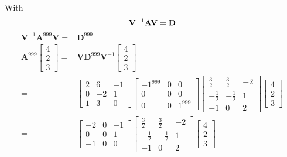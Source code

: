 \documentclass[12pt]{article}
\newcommand{\matr}[1]{\mathbf{#1}}
\begin{document}
With
\begin{equation}
	\matr V^{-1} \matr A \matr V = \matr D \\
\end{equation}
\begin{align}
	\matr V ^{-1} \matr A ^ {999} \matr V =& \matr D^{999} \\
	\matr A ^ {999} \begin{bmatrix}4\\2\\3\end{bmatrix}=& \matr V \matr D ^ {999} \matr V ^ {-1}\begin{bmatrix}4\\2\\3\end{bmatrix} \\
	= & \left[\begin{matrix}2  & 6  & -1 \\0 & -2 & 1\\1 & 3 & 0\end{matrix}\right]
	\left[\begin{matrix}-1^{999} & 0 & 0\\0 & 0 & 0\\0 & 0 & 1^{999}\end{matrix}\right]
	\left[\begin{matrix}\frac{3}{2} & \frac{3}{2} & -2\\- \frac{1}{2} & - \frac{1}{2} & 1\\-1 & 0 & 2\end{matrix}\right]
	\left[\begin{matrix}4\\2\\3\end{matrix}\right] \\
	= & \left[\begin{matrix}-2 & 0  & -1 \\0 & 0 & 1\\-1 & 0 & 0\end{matrix}\right]
	\left[\begin{matrix}\frac{3}{2} & \frac{3}{2} & -2\\- \frac{1}{2} & - \frac{1}{2} & 1\\-1 & 0 & 2\end{matrix}\right]
	\left[\begin{matrix}4\\2\\3\end{matrix}\right] \\

\end{align}
\end{document}
